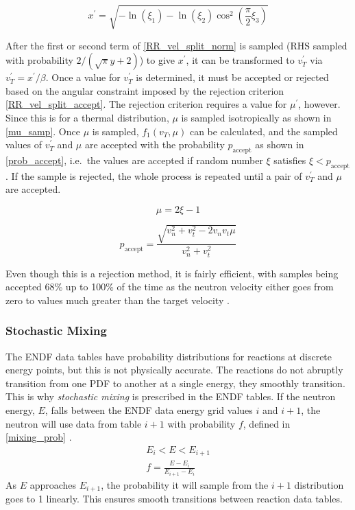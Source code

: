 \begin{equation}
\label{C61_x}
x^\prime =   \sqrt{- \ln( \xi_1) - \ln(\xi_2) \cos^2(\frac{\pi}{2}\xi_3)}
\end{equation}


After the first or second term of \eqref{RR_vel_split_norm} is sampled (RHS sampled with probability $2/(\sqrt{\pi}y+2)$) to give $x^\prime$, it can be transformed to $v_T^\prime$ via $v_T^\prime=x^\prime/\beta$.  Once a value for $v_T^\prime$ is determined, it must be accepted or rejected based on the angular constraint imposed by the rejection criterion \eqref{RR_vel_split_accept}.  The rejection criterion requires a value for $\mu^\prime$, however.  Since this is for a thermal distribution, $\mu$ is sampled isotropically as shown in \eqref{mu_samp}.  Once $\mu$ is sampled, $f_1(v_T,\mu)$ can be calculated, and the sampled values of $v_T^\prime$ and $\mu$ are accepted with the probability $p_\mathrm{accept}$ as shown in \eqref{prob_accept}, i.e.\ the values are accepted if random number $\xi$ satisfies $\xi<p_\mathrm{accept}$.  If the sample is rejected, the whole process is repeated until a pair of $v_T^\prime$ and $\mu$ are accepted.  


\begin{equation}
\label{mu_samp}
\mu = 2\xi - 1 
\end{equation}

\begin{equation}
\label{prob_accept}
p_\mathrm{accept} = \frac{\sqrt{v_n^2+v_t^2-2 v_n v_t \mu}}{v_n^2+v_t^2}
\end{equation}

Even though this is a rejection method, it is fairly efficient, with samples being accepted 68\% up to 100\% of the time as the neutron velocity either goes from zero to values much greater than the target velocity \cite{mcnp}.

\subsubsection{Stochastic Mixing}

The ENDF data tables have probability distributions for reactions at discrete energy points, but this is not physically accurate.  The reactions do not abruptly transition from one PDF to another at a single energy, they smoothly transition.  This is why \emph{stochastic mixing} is prescribed in the ENDF tables.  If the neutron energy, $E$, falls between the ENDF data energy grid values $i$ and $i+1$, the neutron will use data from table $i+1$ with probability $f$, defined in \eqref{mixing_prob} \cite{openmc}.
%
\begin{equation}
\label{mixing_prob}
\begin{gathered}
E_i < E < E_{i+1} \\
f = \frac{E-E_i}{E_{i+1}-E_i}
\end{gathered}
\end{equation}
%
As $E$ approaches $E_{i+1}$, the probability it will sample from the $i+1$ distribution goes to 1 linearly.  This ensures smooth transitions between reaction data tables.

